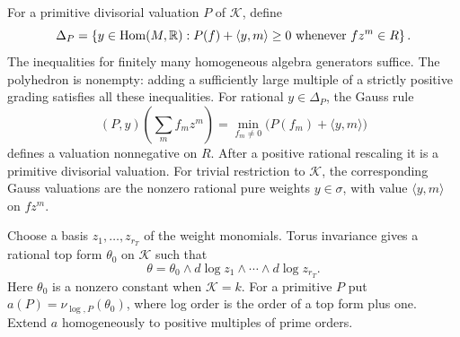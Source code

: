 For a primitive divisorial valuation $P$ of $\mathcal K$, define
\begin{equation}\label{eq:D-polyhedron}
 \Delta_P=\left\{y\in\operatorname{Hom}(M,\mathbb R):
 P(f)+\langle y,m\rangle\ge0\text{ whenever }fz^m\in R\right\}.
\end{equation}
The inequalities for finitely many homogeneous algebra generators suffice.
The polyhedron is nonempty: adding a sufficiently large multiple of a
strictly positive grading satisfies all these inequalities.  For rational
$y\in\Delta_P$, the Gauss rule
\[
 (P,y)\left(\sum_m f_mz^m\right)
   =\min_{f_m\ne0}\bigl(P(f_m)+\langle y,m\rangle\bigr)
\]
defines a valuation nonnegative on $R$.  After a positive rational
rescaling it is a primitive divisorial valuation.  For trivial restriction
to $\mathcal K$, the corresponding Gauss valuations are the nonzero rational
pure weights $y\in\sigma$, with value $\langle y,m\rangle$ on $fz^m$.

Choose a basis $z_1,\ldots,z_{r_T}$ of the weight monomials.  Torus
invariance gives a rational top form $\theta_0$ on $\mathcal K$ such that
\[
 \theta=\theta_0\wedge d\log z_1\wedge\cdots\wedge d\log z_{r_T}.
\]
Here $\theta_0$ is a nonzero constant when $\mathcal K=k$.  For a primitive
$P$ put $a(P)=\nu_{\log,P}(\theta_0)$, where log order is the order of a top
form plus one.  Extend $a$ homogeneously to positive multiples of prime
orders.

